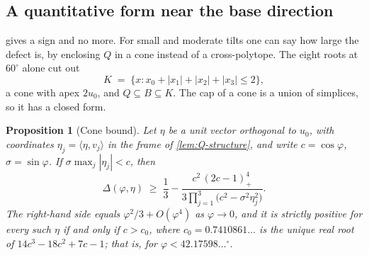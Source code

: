 \documentclass[11pt,reqno]{amsart}
\renewcommand{\_}{\origunderscore\allowbreak}
\numberwithin{equation}{section}
\theoremstyle{plain}
\newtheorem{prop}[thm]{Proposition}
\theoremstyle{definition}
\theoremstyle{remark}
\newcommand{\tilt}{\varphi}                  %
\newcommand{\dev}{\eta}                      %
\newcommand{\defect}{\Delta}                 %
\newcommand{\base}{u}                        %
\begin{document}
\subsection{A quantitative form near the base direction}\label{sec:quantitative-cone}

 gives a sign and no more. For small and moderate
tilts one can say how large the defect is, by enclosing $Q$ in a cone instead of a cross-polytope. The eight roots at $60^\circ$ alone
cut out
\[
  K \;=\; \bigl\{x : x_0+|x_1|+|x_2|+|x_3|\le2\bigr\},
\]
a cone with apex $2\base_0$, and $Q\subseteq B\subseteq K$. The cap of a
cone is a union of simplices, so it has a closed form.

\begin{prop}[Cone bound]\label{cor:second-order}
Let $\dev$ be a unit vector orthogonal to $\base_0$, with coordinates
$\dev_j=\langle\dev,v_j\rangle$ in the frame of \cref{lem:Q-structure},
and write $c=\cos\tilt$, $\sigma=\sin\tilt$. If
$\sigma\max_j|\dev_j|<c$, then
\begin{equation}\label{eq:cone-bound}
  \defect(\tilt,\dev)\;\ge\;
  \frac13-\frac{c^2\,(2c-1)_+^4}{3\prod_{j=1}^{3}\bigl(c^2-\sigma^2\dev_j^2\bigr)} .
\end{equation}
The right-hand side equals $\tilt^2/3+O(\tilt^4)$ as $\tilt\to0$, and it
is strictly positive for every such $\dev$ if and only if $c>c_0$, where
$c_0=0.7410861\ldots$ is the unique real root of
$14c^3-18c^2+7c-1$; that is, for $\tilt<42.17598\ldots^\circ$.
\end{prop}
\end{document}
